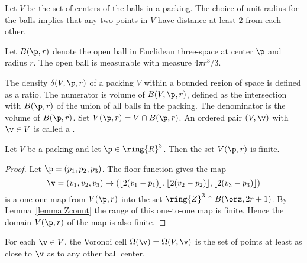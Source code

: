 Let $ V$ be the set of centers of the balls in a
packing. The choice of unit radius for the
balls implies that any two points in $ V$ have distance at
least $2$ from each other. 
%

Let $B(\p,r)$ denote the open ball in
Euclidean three-space at center $\p$ and radius $r$.  The open ball
is measurable with measure $4\pi r^3/3$.
%
%

The density $\delta( V,\p,r)$ of a packing $ V$ within a bounded
region of space is defined as a ratio. The numerator is volume of $B(
V,\p,r)$, defined as the intersection with $B(\p,r)$ of the union of
all balls in the packing.  The denominator is the volume of $B(\p,r)$.
Set $ V(\p,r) = V \cap
B(\p,r)$. %
An ordered pair $( V,\v)$ with $\v\in V$ is called a .  %
%
%

\begin{lemma}
\label{lemma:V-finite}
Let $ V$ be a packing and let $\p\in\ring{R}^3$.
Then the set $ V(\p,r)$ is finite.
\end{lemma}

\begin{proof}  Let $\p = (p_1,p_2,p_3)$. The floor function gives the map
\begin{displaymath}\v=(v_1,v_2,v_3)\mapsto (\lfloor 2(v_1-p_1)
\rfloor, \lfloor 2(v_2-p_2) \rfloor, \lfloor 2(v_3-p_3) \rfloor)\end{displaymath}
is a one-one map from $ V(\p,r)$ into the set $\ring{Z}^3\cap B(\orz,2r + 1)$.  By Lemma~\ref{lemma:Zcount} the range of this one-to-one map is finite. 
Hence the domain $ V(\p,r)$ of the map is also finite.
\end{proof}
%


\begin{definition}\label{def:voronoi}
% 
For each $\v\in  V$, the Voronoi cell
$\Omega(\v)=\Omega( V,\v)$
is the set of points at least as close to $\v$ as to
any other ball center. 
\end{definition}


